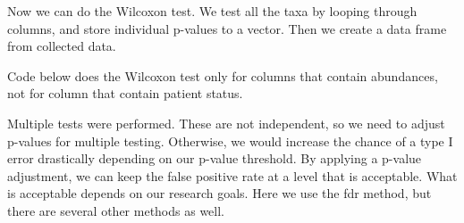 \documentclass[
]{book}
\newenvironment{Shaded}{\begin{snugshade}}{\end{snugshade}}
\newcommand{\AttributeTok}[1]{\textcolor[rgb]{0.77,0.63,0.00}{#1}}
\newcommand{\CommentTok}[1]{\textcolor[rgb]{0.56,0.35,0.01}{\textit{#1}}}
\newcommand{\ControlFlowTok}[1]{\textcolor[rgb]{0.13,0.29,0.53}{\textbf{#1}}}
\newcommand{\FunctionTok}[1]{\textcolor[rgb]{0.00,0.00,0.00}{#1}}
\newcommand{\NormalTok}[1]{#1}
\newcommand{\OtherTok}[1]{\textcolor[rgb]{0.56,0.35,0.01}{#1}}
\newcommand{\SpecialCharTok}[1]{\textcolor[rgb]{0.00,0.00,0.00}{#1}}
\newcommand{\StringTok}[1]{\textcolor[rgb]{0.31,0.60,0.02}{#1}}
\begin{document}
Now we can do the Wilcoxon test. We test all the taxa by looping through columns,
and store individual p-values to a vector. Then we create a data frame from collected
data.

Code below does the Wilcoxon test only for columns that contain abundances,
not for column that contain patient status.

\begin{Shaded}
\end{Shaded}

Multiple tests were performed. These are not independent, so we need
to adjust p-values for multiple testing. Otherwise, we would increase
the chance of a type I error drastically depending on our p-value
threshold. By applying a p-value adjustment, we can keep the false
positive rate at a level that is acceptable. What is acceptable
depends on our research goals. Here we use the fdr method, but there
are several other methods as well.
\end{document}
